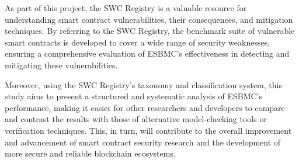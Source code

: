 As part of this project, the SWC Registry is a valuable resource for understanding smart contract vulnerabilities, their consequences, and mitigation techniques. By referring to the SWC Registry, the benchmark suite of vulnerable smart contracts is developed to cover a wide range of security weaknesses, ensuring a comprehensive evaluation of ESBMC's effectiveness in detecting and mitigating these vulnerabilities.

Moreover, using the SWC Registry's taxonomy and classification system, this study aims to present a structured and systematic analysis of ESBMC's performance, making it easier for other researchers and developers to compare and contrast the results with those of alternative model-checking tools or verification techniques. This, in turn, will contribute to the overall improvement and advancement of smart contract security research and the development of more secure and reliable blockchain ecosystems.

